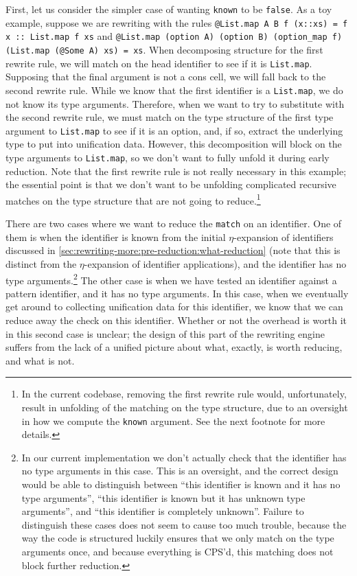 First, let us consider the simpler case of wanting \texttt{known} to be \texttt{false}.
As a toy example, suppose we are rewriting with the rules \texttt{@List.map A B f (x::xs) = f x :: List.map f xs} and \texttt{@List.map (option A) (option B) (option_map f) (List.map (@Some A) xs) = xs}.
When decomposing structure for the first rewrite rule, we will match on the head identifier to see if it is \texttt{List.map}.
Supposing that the final argument is not a cons cell, we will fall back to the second rewrite rule.
While we know that the first identifier is a \texttt{List.map}, we do not know its type arguments.
Therefore, when we want to try to substitute with the second rewrite rule, we must match on the type structure of the first type argument to \texttt{List.map} to see if it is an option, and, if so, extract the underlying type to put into unification data.
However, this decomposition will block on the type arguments to \texttt{List.map}, so we don't want to fully unfold it during early reduction.
Note that the first rewrite rule is not really necessary in this example; the essential point is that we don't want to be unfolding complicated recursive matches on the type structure that are not going to reduce.\footnote{%
  In the current codebase, removing the first rewrite rule would, unfortunately, result in unfolding of the matching on the type structure, due to an oversight in how we compute the \texttt{known} argument.
  See the next footnote for more details.%
}

There are two cases where we want to reduce the \texttt{match} on an identifier.
One of them is when the identifier is known from the initial $\eta$-expansion of identifiers discussed in \autoref{sec:rewriting-more:pre-reduction:what-reduction} (note that this is distinct from the $\eta$-expansion of identifier applications), and the identifier has no type arguments.\footnote{%
  In our current implementation we don't actually check that the identifier has no type arguments in this case.
  This is an oversight, and the correct design would be able to distinguish between ``this identifier is known and it has no type arguments'', ``this identifier is known but it has unknown type arguments'', and ``this identifier is completely unknown''.
  Failure to distinguish these cases does not seem to cause too much trouble, because the way the code is structured luckily ensures that we only match on the type arguments once, and because everything is CPS'd, this matching does not block further reduction.%
}
The other case is when we have tested an identifier against a pattern identifier, and it has no type arguments.
In this case, when we eventually get around to collecting unification data for this identifier, we know that we can reduce away the check on this identifier.
Whether or not the overhead is worth it in this second case is unclear; the design of this part of the rewriting engine suffers from the lack of a unified picture about what, exactly, is worth reducing, and what is not.


